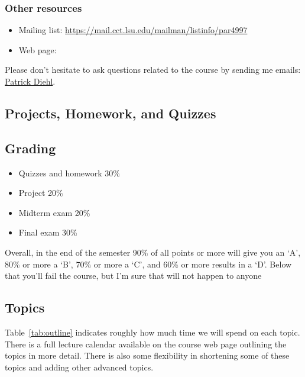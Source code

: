 \documentclass[11pt,letterpaper]{article}
\begin{document}
\subsubsection*{Other resources}

\begin{itemize}
\item Mailing list: \url{https://mail.cct.lsu.edu/mailman/listinfo/par4997}
\item Web page:
\end{itemize}

Please don’t hesitate to ask questions related to the course by sending me emails: \href{mailto:patrickdiehl@lsu.edu}{Patrick Diehl}. 

\subsection*{Projects, Homework, and Quizzes}

\subsection*{Grading}
\begin{itemize}
\item Quizzes and homework 30\%
\item Project 20\%
\item Midterm exam 20\%
\item Final exam 30\%
\end{itemize}
Overall, in the end of the semester 90\% of all points or more will give you an ‘A’, 80\% or more a ‘B’, 70\% or more a ‘C’, and 60\% or more results in a ‘D’. Below that you’ll fail the course, but I’m sure that will not happen to anyone

\subsection*{Topics}

Table~\ref{tab:outline} indicates roughly how much time we will spend on each topic. There  is  a  full  lecture  calendar  available  on  the  course  web page  outlining  the  topics  in  more  detail. There  is  also some flexibility in shortening some of these topics and adding other advanced topics.
\end{document}

